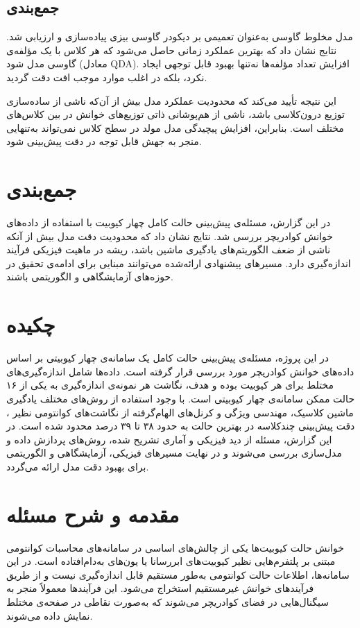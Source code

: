 \subsection{جمع‌بندی}

مدل مخلوط گاوسی به‌عنوان تعمیمی بر دیکودر گاوسی بیزی پیاده‌سازی و ارزیابی شد. نتایج نشان داد که بهترین عملکرد زمانی حاصل می‌شود که هر کلاس با یک مؤلفه‌ی گاوسی مدل شود (معادل QDA). افزایش تعداد مؤلفه‌ها نه‌تنها بهبود قابل توجهی ایجاد نکرد، بلکه در اغلب موارد موجب افت دقت گردید.

این نتیجه تأیید می‌کند که محدودیت عملکرد مدل بیش از آن‌که ناشی از ساده‌سازی توزیع درون‌کلاسی باشد، ناشی از هم‌پوشانی ذاتی توزیع‌های خوانش در بین کلاس‌های مختلف است. بنابراین، افزایش پیچیدگی مدل مولد در سطح کلاس نمی‌تواند به‌تنهایی منجر به جهش قابل توجه در دقت پیش‌بینی شود.

\section{جمع‌بندی}
در این گزارش، مسئله‌ی پیش‌بینی حالت کامل چهار کیوبیت با استفاده از داده‌های خوانش کوادریچر بررسی شد. نتایج نشان داد که محدودیت دقت مدل بیش از آنکه ناشی از ضعف الگوریتم‌های یادگیری ماشین باشد، ریشه در ماهیت فیزیکی فرآیند اندازه‌گیری دارد. مسیرهای پیشنهادی ارائه‌شده می‌توانند مبنایی برای ادامه‌ی تحقیق در حوزه‌های آزمایشگاهی و الگوریتمی باشند.


\section*{چکیده}
در این پروژه، مسئله‌ی پیش‌بینی حالت کامل یک سامانه‌ی چهار کیوبیتی بر اساس داده‌های خوانش کوادریچر مورد بررسی قرار گرفته است. داده‌ها شامل اندازه‌گیری‌های مختلط برای هر کیوبیت بوده و هدف، نگاشت هر نمونه‌ی اندازه‌گیری به یکی از ۱۶ حالت ممکن سامانه‌ی چهار کیوبیتی است. با وجود استفاده از روش‌های مختلف یادگیری ماشین کلاسیک، مهندسی ویژگی و کرنل‌های الهام‌گرفته از نگاشت‌های کوانتومی نظیر ، دقت پیش‌بینی چندکلاسه در بهترین حالت به حدود ۳۸ تا ۳۹ درصد محدود شده است. در این گزارش، مسئله از دید فیزیکی و آماری تشریح شده، روش‌های پردازش داده و مدل‌سازی بررسی می‌شوند و در نهایت مسیرهای فیزیکی، آزمایشگاهی و الگوریتمی برای بهبود دقت مدل ارائه می‌گردد.

\section{مقدمه و شرح مسئله}
خوانش حالت کیوبیت‌ها یکی از چالش‌های اساسی در سامانه‌های محاسبات کوانتومی مبتنی بر پلتفرم‌هایی نظیر کیوبیت‌های ابررسانا یا یون‌های به‌دام‌افتاده است. در این سامانه‌ها، اطلاعات حالت کوانتومی به‌طور مستقیم قابل اندازه‌گیری نیست و از طریق فرآیندهای خوانش غیرمستقیم استخراج می‌شود. این فرآیندها معمولاً منجر به سیگنال‌هایی در فضای کوادریچر می‌شوند که به‌صورت نقاطی در صفحه‌ی مختلط  نمایش داده می‌شوند.

